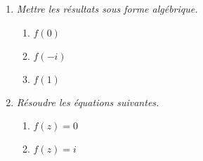 \documentclass[12pt]{article}
\begin{document}
\begin{multicols}{2}

\begin{enumerate}
  \item[1.] \textit{Mettre les résultats sous forme algébrique.}

  \begin{enumerate}
  \item[a)] $f(0)$
  \item[b)] $f(-i)$
  \item[c)] $f(1)$
  \end{enumerate}

  \item[2.] \textit{Résoudre les équations suivantes.}
  \begin{enumerate}
  \item[a)] $f(z) = 0$
  \item[b)] $f(z) = i$
  \end{enumerate}

\end{enumerate}

\end{multicols}
\end{document}
